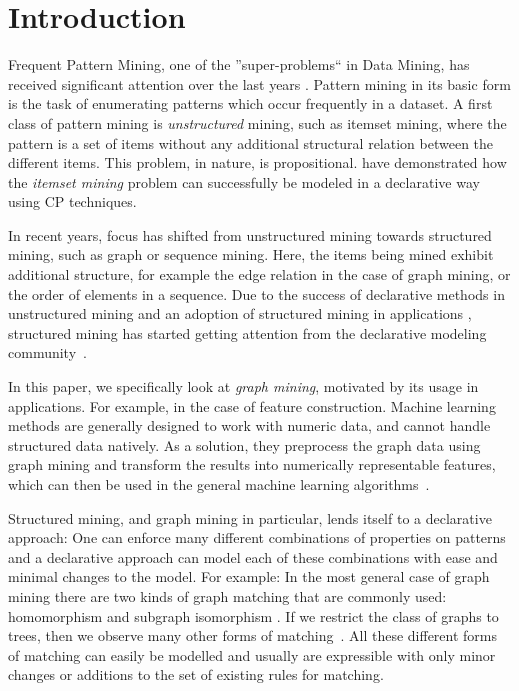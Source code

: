 \section{Introduction}
Frequent Pattern Mining, one of the ''super-problems`` in Data Mining, has received significant attention over the last years \citep{pattern_mining_book}. Pattern mining in its basic form is the task of enumerating patterns which occur frequently in a dataset.
A first class of pattern mining is \emph{unstructured} mining, such as itemset mining, where the pattern is a set of items without any additional structural relation between the different items.
This problem, in nature, is propositional.
\citet{tias_original} have demonstrated how the \emph{itemset mining} problem can successfully be modeled in a declarative way using CP techniques.

In recent years, focus has shifted from unstructured mining towards structured mining, such as graph or sequence mining.
Here, the items being mined exhibit additional structure, for example the edge relation in the case of graph mining, or the order of elements in a sequence.
Due to the success of declarative methods in unstructured mining \citep{tias_original,mining_cp_extra,tias_declarative_pattern_mining} and an adoption of structured mining in applications \citep{pattern_mining_classification}, 
structured mining has started getting attention from the declarative modeling community~\citep{cp_sequence_mining,ilp_graph_mining}.

In this paper, we specifically look at \emph{graph mining}, motivated by its usage in applications. 
For example, in the case of feature construction.
Machine learning methods are generally designed to work with numeric data, and cannot handle structured data natively.
As a solution, they preprocess the graph data using graph mining and transform the results into numerically representable features, which can then be used in the general machine learning algorithms~\citep{pattern_mining_classification}.

Structured mining, and graph mining in particular, lends itself to a declarative approach: One can enforce many different combinations of properties on patterns and a declarative approach can model each of these combinations
with ease and minimal changes to the model.
For example: In the most general case of graph mining there are two kinds of graph matching that are commonly used: homomorphism \citep{theta_subsumption} and subgraph isomorphism \citep{gspan}.
If we restrict the class of graphs to trees, then we observe many other forms of matching~\citep{subtree_overview}.
All these different forms of matching can easily be modelled and usually are expressible with only minor changes or additions to the set of existing rules for matching.

